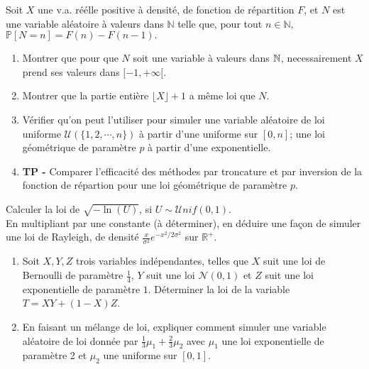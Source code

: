 \documentclass{exercices}
\begin{document}
\begin{exercice}
Soit $X$ une v.a. réélle positive à densité, de fonction de répartition $F$, et $N$ est une variable al\'eatoire
\`a valeurs dans $\mathbb{N}$ telle que, pour tout $n \in \mathbb{N}$,
$\mathbb{P}[N=n]=F(n)-F(n-1).$
\begin{enumerate}
\item Montrer que pour que $N$ soit une variable à valeurs dans $\mathbb{N}$, necessairement $X$ prend ses valeurs dans $[-1,+\infty[$.
\item Montrer que la partie entière $\lfloor X\rfloor +1$ a m\^eme loi que $N$.
\item Vérifier qu'on peut l'utiliser pour simuler une variable aléatoire de loi uniforme ${\mathcal U}(\{1,2,\cdots,n\})$ à partir d'une uniforme sur $[0,n]$; une loi géométrique de paramètre $p$ à partir d'une exponentielle.
\item \textbf{TP -} Comparer l'efficacité des méthodes par troncature et par inversion de la fonction de répartion pour une loi géométrique de paramètre $p$.
\end{enumerate}
\end{exercice}

\begin{exercice}
Calculer la loi de $\sqrt{-\ln(U)}$, si $U\sim \mathcal{U}nif(0,1)$.\\
En multipliant par une constante (à déterminer), en déduire une façon de simuler une loi de Rayleigh, de densité
$\frac{x}{\sigma^2}e^{-x^2/2\sigma^2}$
sur $\mathbb{R}^+$.
\end{exercice}

\begin{exercice}
\begin{enumerate}
  \item Soit $X,Y,Z$ trois variables indépendantes, telles que $X$ suit une loi de Bernoulli de paramètre $\frac{1}{4}$, $Y$ suit une loi $\mathcal{N}(0,1)$ et $Z$ suit une loi exponentielle de paramètre $1$. Déterminer la loi de la variable $T = X Y + (1-X) Z$.
  \item En faisant un mélange de loi, expliquer comment simuler une variable aléatoire de loi donnée par
$\frac{1}{3}\mu_1+\frac{2}{3}\mu_2$ avec $\mu_1$ une loi exponentielle de paramètre 2 et $\mu_2$ une uniforme sur $[0,1]$.
\end{enumerate}

\end{exercice}
\end{document}
